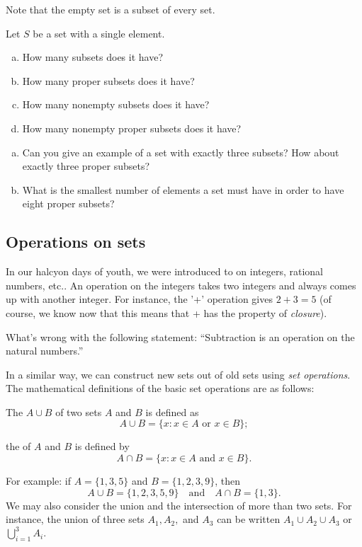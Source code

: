 Note that the empty set is a subset of every set.  

\begin{exercise}{}
Let $S$ be a set with a single element.
\begin{enumerate}[(a)]
\item
How many subsets does it have?
\item
How many proper subsets does it have?
\item
How many nonempty subsets does it have?
\item
How many nonempty proper subsets does it have?
\end{enumerate}
\end{exercise}

\begin{exercise}{7}
\begin{enumerate}[(a)]
\item
Can you give an example of a set with exactly three subsets? How about exactly three proper subsets?
\item
What is the smallest number of elements a set must have in order to have eight proper subsets?
\end{enumerate}
\end{exercise}

\subsection{Operations on sets}
In our halcyon days of youth, we were introduced to  on integers, rational numbers, etc.. An operation on the integers takes two integers and always comes up with another integer. For instance, the '+' operation gives $2+3=5$ (of course, we know now that this means that + has the property of \emph{closure}).

\begin{exercise}{}
What's wrong with the following statement: ``Subtraction is an operation on the natural numbers.''
\end{exercise}

In a similar way, we can construct new sets out of old sets using \emph{set operations}. The mathematical definitions of the basic set operations are as follows:

\begin{defn}
The  $A \cup B$ of two sets $A$ and $B$ is defined as  
\[
A \cup B\label{union} = \{x : x \in A \text{ or } x \in B \};
\]
\end{defn}
\begin{defn}
the  of $A$ and $B$  is defined by 
\[
A \cap B\label{intersection} = \{x :  x \in A \text{ and } x \in B \}.
\]
\end{defn}
For example: if $A = \{1, 3, 5\}$ and $B = \{ 1, 2, 3, 9 \}$, then
\[
A \cup B = \{1, 2, 3, 5, 9 \}
\quad \text{and} \quad
A \cap B = \{ 1, 3 \}.
\]
We may also consider the union and the intersection of more than two sets.  For instance,  the union of three sets $A_1, A_2,$ and $A_3$ can be written   $A_{1} \cup A_2 \cup A_3$ or $\bigcup_{i = 1}^{3} A_{i}. $ 

